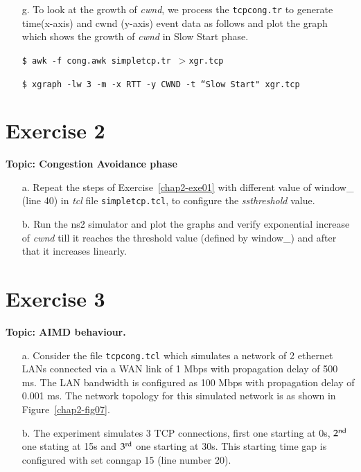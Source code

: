 \begin{multicols}{2}
\begin{itemize}
\item[g.] To look at the growth of \textit{cwnd}, we process the \texttt{tcpcong.tr} to generate time(x-axis) and cwnd (y-axis) event data as follows and plot the graph \cite{art2-key15} which shows the growth of \textit{cwnd} in Slow Start phase.

\texttt{\$  awk -f cong.awk simpletcp.tr $> $xgr.tcp}

\texttt{\$ xgraph -lw 3 -m -x RTT -y CWND -t ``Slow Start" xgr.tcp}
\end{itemize}

\section*{Exercise 2}\label{chap2-exe02}

\textbf{Topic: Congestion Avoidance phase}
\begin{itemize}

\item[a.] Repeat the steps of Exercise~\ref{chap2-exe01} with different value of window\_ (line 40) in \textit{tcl} file \texttt{simpletcp.tcl}, to configure the \textit{ssthreshold} value.

\item[b.] Run the ns2 simulator and plot the graphs and verify  exponential increase of \textit{cwnd} till it reaches the threshold value (defined by window\_) and after that it increases linearly.
\end{itemize}

\section*{Exercise 3}\label{chap2-exe03}

\textbf{Topic: AIMD behaviour.}

\begin{itemize}

\item[a.] Consider the file \texttt{tcpcong.tcl} which simulates a network of 2 ethernet LANs connected via a WAN link of 1 Mbps with propagation delay of 500 ms. The LAN bandwidth is configured as 100 Mbps with propagation delay of 0.001 ms. The network topology for this simulated network is as shown in Figure~\ref{chap2-fig07}.

\item[b.] The experiment simulates 3 TCP connections, first one starting at 0s, ${\rm 2}^{\text{nd}}$ one stating at 15s and ${\rm 3}^{\text{rd}}$ one starting at 30s. This starting time gap is configured with set conngap 15 (line number 20).


\end{itemize}
\end{multicols}
